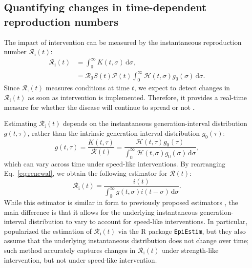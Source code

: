 \documentclass[12pt]{article}
\newcommand{\eref}[1]{Eq.~\ref{eq:#1}}
\newcommand{\Rx}[1]{\ensuremath{{\mathcal R}_{#1}}\xspace}
\newcommand{\Ri}{\Rx{\mathrm{i}}}
\newcommand{\RR}{\ensuremath{{\mathcal R}}\xspace}
\newcommand{\dd}[1]{\ensuremath{\, \mathrm{d}#1}}
\newcommand{\dsigma}{\dd{\sigma}}
\newcommand{\PP}{{\mathcal P}}
\newcommand{\HH}{\ensuremath{\mathcal H}}
\begin{document}
\subsection{Quantifying changes in time-dependent reproduction numbers}

The impact of intervention can be measured by the instantaneous reproduction number $\Ri(t)$:
\begin{align}
\Ri(t) &= \int_0^\infty K(t, \sigma) \dsigma, \\
&= \RR_0 S(t) \PP(t) \int_0^\infty \HH(t,\sigma) g_0(\sigma) \dsigma.
\label{eq:rt}
\end{align}
Since $\Ri(t)$ measures conditions at time $t$, we expect to detect changes in $\Ri(t)$ as soon as intervention is implemented.
Therefore, it provides a real-time measure for whether the disease will continue to spread or not \citep{gostic2020practical}.

Estimating $\Ri(t)$ depends on the instantaneous generation-interval distribution $g(t, \tau)$, rather than the intrinsic generation-interval distribution $g_0(\tau)$:
\begin{equation}
g(t, \tau) = \frac{K(t, \tau)}{\RR(t)} = \frac{\HH(t,\tau) g_0(\tau)}{\int_0^\infty \HH(t,\sigma) g_0(\sigma) \dsigma},
\end{equation}
which can vary across time under speed-like interventions.
By rearranging \eref{renewal}, we obtain the following estimator for $\RR(t)$:
\begin{equation}
\Ri(t) = \frac{i(t)}{\int_0^\infty g(t, \sigma) i(t-\sigma) \dsigma}.
\end{equation}
While this estimator is similar in form to previously proposed estimators \citep{fraser2007estimating}, the main difference is that it allows for the underlying instantaneous generation-interval distribution to vary to account for speed-like interventions.
In particular, \cite{cori2013new} popularized the estimation of $\Ri(t)$ via the R package \texttt{EpiEstim}, but they also assume that the underlying instantaneous distribution does not change over time; 
such method accurately captures changes in $\Ri(t)$ under strength-like intervention, but not under speed-like intervention.
\end{document}
